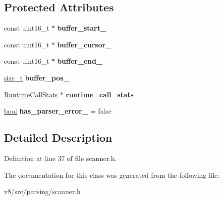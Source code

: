 \subsection*{Protected Attributes}
\begin{DoxyCompactItemize}
\item 
\mbox{\label{classv8_1_1internal_1_1Utf16CharacterStream_a280cbd9f8fde89ecdf69a753e49e6cb7}} 
const uint16\+\_\+t $\ast$ {\bfseries buffer\+\_\+start\+\_\+}
\item 
\mbox{\label{classv8_1_1internal_1_1Utf16CharacterStream_ac90ab8606aa8b34c62cb4d0005fe64a6}} 
const uint16\+\_\+t $\ast$ {\bfseries buffer\+\_\+cursor\+\_\+}
\item 
\mbox{\label{classv8_1_1internal_1_1Utf16CharacterStream_a13a08f07ebe18c4632db92a4e9f19e7c}} 
const uint16\+\_\+t $\ast$ {\bfseries buffer\+\_\+end\+\_\+}
\item 
\mbox{\label{classv8_1_1internal_1_1Utf16CharacterStream_a058db637f2822a7f2a01ddf62ae2d039}} 
\mbox{\hyperlink{classsize__t}{size\+\_\+t}} {\bfseries buffer\+\_\+pos\+\_\+}
\item 
\mbox{\label{classv8_1_1internal_1_1Utf16CharacterStream_a1caf68cd2f6f0ae2b646d9f773b04c6f}} 
\mbox{\hyperlink{classv8_1_1internal_1_1RuntimeCallStats}{Runtime\+Call\+Stats}} $\ast$ {\bfseries runtime\+\_\+call\+\_\+stats\+\_\+}
\item 
\mbox{\label{classv8_1_1internal_1_1Utf16CharacterStream_a07c9c6b4a20e8005919b7a81a656f7b9}} 
\mbox{\hyperlink{classbool}{bool}} {\bfseries has\+\_\+parser\+\_\+error\+\_\+} = false
\end{DoxyCompactItemize}


\subsection{Detailed Description}


Definition at line 37 of file scanner.\+h.



The documentation for this class was generated from the following file\+:\begin{DoxyCompactItemize}
\item 
v8/src/parsing/scanner.\+h\end{DoxyCompactItemize}
